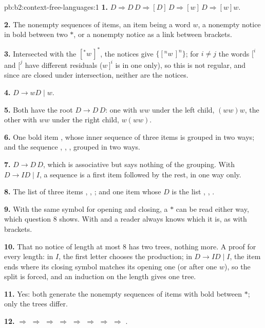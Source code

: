 \begin{solution}{pb:b2:context-free-languages:1}
\textbf{1.} $D \Rightarrow D\,D \Rightarrow [D]\,D \Rightarrow [w]\,D \Rightarrow [w]w$.

\textbf{2.} The nonempty sequences of items, an item being a word $w$, a nonempty notice in bold between two $*$, or
a nonempty notice as a link between brackets.

\textbf{3.} Intersected with the  $[^*w\,]^*$, the notices give $\{[^nw\,]^n\}$; for $i \ne j$ the
words $[^i$ and $[^j$ have different residuals ($w\,]^i$ is in one only), so this is not regular, and since  are closed under intersection, neither are the notices.

\textbf{4.} $D \to wD \mid w$.

\textbf{5.} Both have the root $D \to D\,D$: one with $ww$ under the left child, $(ww)w$, the other with $ww$ under the
right child, $w(ww)$.

\textbf{6.} One bold item , whose inner sequence of three items is grouped in two ways; and the
sequence , , , grouped in two ways.

\textbf{7.} $D \to D\,D$, which is associative but says nothing of the grouping. With $D \to ID \mid I$, a sequence is a
first item followed by the rest, in one way only.

\textbf{8.} The list of three items , , ; and one item  whose $D$ is the list ,
, .

\textbf{9.} With the same symbol for opening and closing, a $*$ can be read either way, which question 8 shows. With
\code{<} and \code{>} a reader always knows which it is, as with brackets.

\textbf{10.} That no notice of length at most 8 has two trees, nothing more. A proof for every length: in $I$, the
first letter chooses the production; in $D \to ID \mid I$, the item ends where its closing symbol matches its opening
one (or after one $w$), so the split is forced, and an induction on the length gives one tree.

\textbf{11.} Yes: both generate the nonempty sequences of items with bold between $*$; only the trees differ.

\textbf{12.}  $\Rightarrow$  $\Rightarrow$  $\Rightarrow$  $\Rightarrow$  $\Rightarrow$  $\Rightarrow$  $\Rightarrow$  $\Rightarrow$ .


\end{solution}
